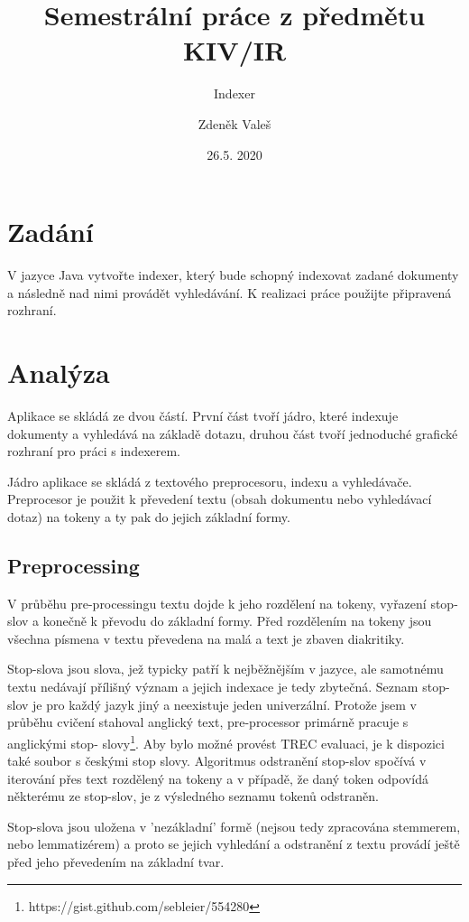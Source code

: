 \documentclass[11pt,a4paper]{scrartcl}
\begin{document}
	\title{Semestrální práce z předmětu KIV/IR}
	\subtitle{Indexer}
	\author{Zdeněk Valeš}
	\date{26.5. 2020}
	\maketitle
	\newpage
	
	\section{Zadání}
	V jazyce Java vytvořte indexer, který bude schopný indexovat zadané dokumenty a následně nad nimi provádět vyhledávání. K realizaci práce použijte připravená rozhraní.
	
	\section{Analýza}
	Aplikace se skládá ze dvou částí. První část tvoří jádro, které indexuje dokumenty a vyhledává na základě dotazu, druhou část tvoří jednoduché grafické rozhraní pro práci s indexerem.
	
	Jádro aplikace se skládá z textového preprocesoru, indexu a vyhledávače. Preprocesor je použit k převedení textu (obsah dokumentu nebo vyhledávací dotaz) na tokeny a ty pak do jejich základní formy.
	
	\subsection{Preprocessing}
	
	V průběhu pre-processingu textu dojde k jeho rozdělení na tokeny, vyřazení stop-slov a konečně k převodu do základní formy. Před rozdělením na tokeny jsou všechna písmena v textu převedena na malá a text je zbaven diakritiky.
	
	Stop-slova jsou slova, jež typicky patří k nejběžnějším v jazyce, ale samotnému textu nedávají přílišný význam a jejich indexace je tedy zbytečná. Seznam stop-slov je pro každý jazyk jiný a neexistuje jeden univerzální. Protože jsem v průběhu cvičení stahoval anglický text, pre-processor primárně pracuje s anglickými stop- slovy\footnote{https://gist.github.com/sebleier/554280}. Aby bylo možné provést TREC evaluaci, je k dispozici také soubor s českými stop slovy. Algoritmus odstranění stop-slov spočívá v iterování přes text rozdělený na tokeny a v případě, že daný token odpovídá některému ze stop-slov, je z výsledného seznamu tokenů odstraněn.
	
	Stop-slova jsou uložena v 'nezákladní' formě (nejsou tedy zpracována stemmerem, nebo lemmatizérem) a proto se jejich vyhledání a odstranění z textu provádí ještě před jeho převedením na základní tvar.
	
\end{document}

